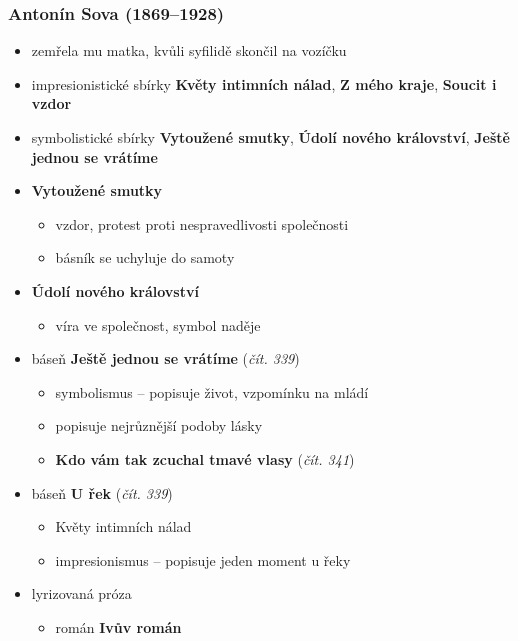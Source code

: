 \subsubsection{Antonín Sova (1869--1928)}
\begin{itemize}
\item zemřela mu matka, kvůli syfilidě skončil na vozíčku
\item impresionistické sbírky \textbf{Květy intimních nálad}, \textbf{Z mého kraje}, \textbf{Soucit i vzdor}
\item symbolistické sbírky \textbf{Vytoužené smutky}, \textbf{Údolí nového království}, \textbf{Ještě jednou se vrátíme}
\item \textbf{Vytoužené smutky}
	\begin{itemize}
	\item vzdor, protest proti nespravedlivosti společnosti
	\item básník se uchyluje do samoty
	\end{itemize}
\item \textbf{Údolí nového království}
	\begin{itemize}
	\item víra ve společnost, symbol naděje
	\end{itemize}

\item báseň \textbf{Ještě jednou se vrátíme} (\textit{čít. 339})
	\begin{itemize}
	\item symbolismus -- popisuje život, vzpomínku na mládí
	\item popisuje nejrůznější podoby lásky
	\item \textbf{Kdo vám tak zcuchal tmavé vlasy} (\textit{čít. 341})
	\end{itemize}
\item báseň \textbf{U řek} (\textit{čít. 339})
	\begin{itemize}
	\item Květy intimních nálad
	\item impresionismus -- popisuje jeden moment u řeky
	\end{itemize}
\item lyrizovaná próza
	\begin{itemize}
	\item román \textbf{Ivův román}
	\end{itemize}
\end{itemize}

